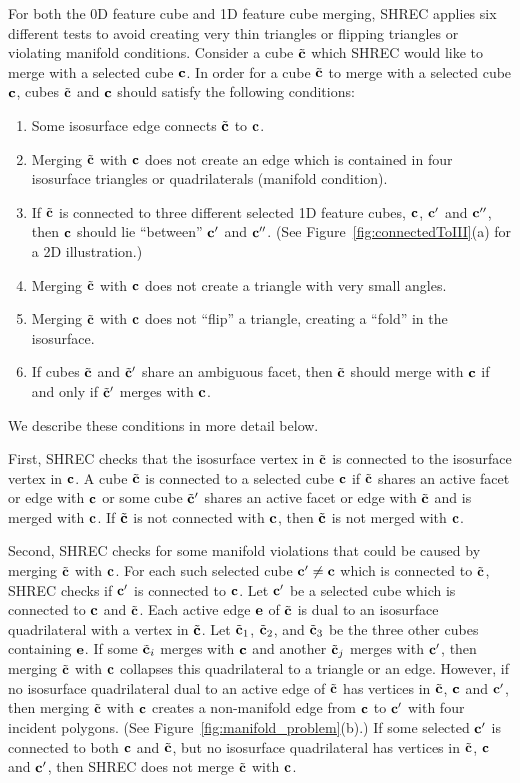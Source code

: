 For both the 0D feature cube and 1D feature cube merging,
SHREC applies six different tests to avoid creating very thin triangles
or flipping triangles or violating manifold conditions.
Consider a cube ${\tilde{\mathbf{c}}}$ which SHREC would like to merge 
with a selected cube $\mathbf{c}$.
In order for a cube ${\tilde{\mathbf{c}}}$ to merge with a selected cube $\mathbf{c}$,
cubes ${\tilde{\mathbf{c}}}$ and $\mathbf{c}$ should satisfy the following conditions:
\begin{enumerate}
\item Some isosurface edge connects ${\tilde{\mathbf{c}}}$ to $\mathbf{c}$.
\item Merging ${\tilde{\mathbf{c}}}$ with $\mathbf{c}$ does not create an edge 
which is contained in four isosurface triangles or quadrilaterals
(manifold condition).
\item If ${\tilde{\mathbf{c}}}$ is connected to three different selected 1D feature cubes,
$\mathbf{c}$, $\mathbf{c}'$ and $\mathbf{c}''$,
then $\mathbf{c}$ should lie ``between'' $\mathbf{c}'$ and $\mathbf{c}''$.
(See Figure~\ref{fig:connectedToIII}(a) for a 2D illustration.)
\item Merging ${\tilde{\mathbf{c}}}$ with $\mathbf{c}$ does not create a triangle
with very small angles.
\item Merging ${\tilde{\mathbf{c}}}$ with $\mathbf{c}$ does not ``flip'' a triangle,
creating a ``fold'' in the isosurface.
\item If cubes ${\tilde{\mathbf{c}}}$ and ${\tilde{\mathbf{c}}}'$ share an ambiguous facet,
then ${\tilde{\mathbf{c}}}$ should merge with $\mathbf{c}$ if and only if ${\tilde{\mathbf{c}}}'$ merges with $\mathbf{c}$.
\end{enumerate}
We describe these conditions in more detail below.

First, SHREC checks that the isosurface vertex in ${\tilde{\mathbf{c}}}$
is connected to the isosurface vertex in $\mathbf{c}$.
A cube ${\tilde{\mathbf{c}}}$ is connected to a selected cube $\mathbf{c}$
if ${\tilde{\mathbf{c}}}$ shares an active facet or edge with $\mathbf{c}$
or some cube ${\tilde{\mathbf{c}}}'$ shares an active facet or edge with ${\tilde{\mathbf{c}}}$ and
is merged with $\mathbf{c}$.
If ${\tilde{\mathbf{c}}}$ is not connected with $\mathbf{c}$, then ${\tilde{\mathbf{c}}}$ is not merged with $\mathbf{c}$.

Second, SHREC checks for some manifold violations that
could be caused by merging ${\tilde{\mathbf{c}}}$ with $\mathbf{c}$.
For each such selected cube $\mathbf{c}' \neq \mathbf{c}$ which is connected to ${\tilde{\mathbf{c}}}$,
SHREC checks if $\mathbf{c}'$ is connected to $\mathbf{c}$.
Let $\mathbf{c}'$ be a selected cube which is connected to $\mathbf{c}$ and ${\tilde{\mathbf{c}}}$.
Each active edge $\mathbf{e}$ of ${\tilde{\mathbf{c}}}$ is dual to an isosurface quadrilateral
with a vertex in ${\tilde{\mathbf{c}}}$.
Let ${\tilde{\mathbf{c}}}_1$, ${\tilde{\mathbf{c}}}_2$, and ${\tilde{\mathbf{c}}}_3$ be the three other cubes containing $\mathbf{e}$.
If some ${\tilde{\mathbf{c}}}_i$ merges with $\mathbf{c}$ and another ${\tilde{\mathbf{c}}}_j$ merges with $\mathbf{c}'$,
then merging ${\tilde{\mathbf{c}}}$ with $\mathbf{c}$ collapses this quadrilateral to a triangle
or an edge.
However, if no isosurface quadrilateral dual to an active edge of ${\tilde{\mathbf{c}}}$
has vertices in ${\tilde{\mathbf{c}}}$, $\mathbf{c}$ and $\mathbf{c}'$,
then merging ${\tilde{\mathbf{c}}}$ with $\mathbf{c}$ creates a non-manifold edge 
from $\mathbf{c}$ to $\mathbf{c}'$ with four incident polygons.
(See Figure~\ref{fig:manifold_problem}(b).)
If some selected $\mathbf{c}'$ is connected to both $\mathbf{c}$ and ${\tilde{\mathbf{c}}}$,
but no isosurface quadrilateral has vertices in ${\tilde{\mathbf{c}}}$, $\mathbf{c}$ and $\mathbf{c}'$,
then SHREC does not merge ${\tilde{\mathbf{c}}}$ with $\mathbf{c}$.

